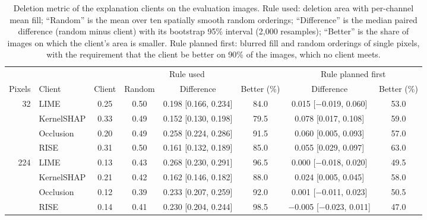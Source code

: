 \begin{table}[!tbp]
\centering\footnotesize\setlength{\tabcolsep}{4pt}
\caption{Deletion metric of the explanation clients on the evaluation images. Rule used: deletion area with per-channel mean fill; ``Random'' is the mean over ten spatially smooth random orderings; ``Difference'' is the median paired difference (random minus client) with its bootstrap 95\% interval (2{,}000 resamples); ``Better'' is the share of images on which the client's area is smaller. Rule planned first: blurred fill and random orderings of single pixels, with the requirement that the client be better on 90\% of the images, which no client meets.}
\label{tab:explutility}
\vspace{3pt}
\begin{adjustbox}{max width=\textwidth}
\begin{tabular}{rlcccccc}
\toprule
& & \multicolumn{4}{c}{Rule used} & \multicolumn{2}{c}{Rule planned first} \\
\cmidrule(lr){3-6}\cmidrule(lr){7-8}
Pixels & Client & Client & Random & Difference & Better (\%) & Difference & Better (\%) \\
\midrule
32 & LIME & 0.25 & 0.50 & 0.198 {[}0.166, 0.234{]} & 84.0 & 0.015 {[}$-$0.019, 0.060{]} & 53.0 \\
 & KernelSHAP & 0.33 & 0.49 & 0.152 {[}0.130, 0.198{]} & 79.5 & 0.078 {[}0.017, 0.108{]} & 59.0 \\
 & Occlusion & 0.20 & 0.49 & 0.258 {[}0.224, 0.286{]} & 91.5 & 0.060 {[}0.005, 0.093{]} & 57.0 \\
 & RISE & 0.31 & 0.50 & 0.161 {[}0.132, 0.189{]} & 85.0 & 0.055 {[}0.029, 0.097{]} & 63.0 \\
224 & LIME & 0.13 & 0.43 & 0.268 {[}0.230, 0.291{]} & 96.5 & 0.000 {[}$-$0.018, 0.020{]} & 49.5 \\
 & KernelSHAP & 0.21 & 0.42 & 0.162 {[}0.146, 0.182{]} & 88.0 & 0.024 {[}0.005, 0.045{]} & 58.0 \\
 & Occlusion & 0.12 & 0.39 & 0.233 {[}0.207, 0.259{]} & 92.0 & 0.001 {[}$-$0.011, 0.023{]} & 50.5 \\
 & RISE & 0.14 & 0.41 & 0.230 {[}0.204, 0.244{]} & 98.5 & $-$0.005 {[}$-$0.023, 0.011{]} & 47.0 \\
\bottomrule
\end{tabular}
\end{adjustbox}
\end{table}

